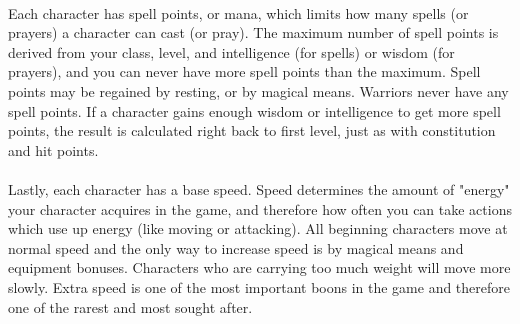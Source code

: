 \paragraph{}Each character has spell points, or mana, which limits how many spells
(or prayers) a character can cast (or pray). The maximum number of
spell points is derived from your class, level, and intelligence (for
spells) or wisdom (for prayers), and you can never have more spell
points than the maximum. Spell points may be regained by resting, or by
magical means. Warriors never have any spell points. If a character
gains enough wisdom or intelligence to get more spell points, the result
is calculated right back to first level, just as with constitution and
hit points.

\paragraph{}Lastly, each character has a base speed. Speed determines the amount of
"energy" your character acquires in the game, and therefore how often
you can take actions which use up energy (like moving or attacking).
All beginning characters move at normal speed and the only way to
increase speed is by magical means and equipment bonuses. Characters
who are carrying too much weight will move more slowly. Extra speed is
one of the most important boons in the game and therefore one of the
rarest and most sought after.

